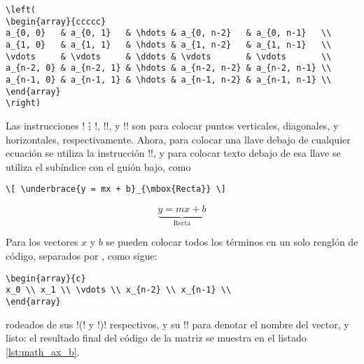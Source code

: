 \begin{lstlisting}[style=latex,numbers=none]
\left(
\begin{array}{ccccc}
a_{0, 0}   & a_{0, 1}   & \hdots & a_{0, n-2}   & a_{0, n-1}   \\
a_{1, 0}   & a_{1, 1}   & \hdots & a_{1, n-2}   & a_{1, n-1}   \\
\vdots     & \vdots     & \ddots & \vdots       & \vdots       \\
a_{n-2, 0} & a_{n-2, 1} & \hdots & a_{n-2, n-2} & a_{n-2, n-1} \\
a_{n-1, 0} & a_{n-1, 1} & \hdots & a_{n-1, n-2} & a_{n-1, n-1} \\
\end{array}
\right)
\end{lstlisting}

Las instrucciones !\vdots!, !\ddots!, y !\hdots! son para colocar puntos verticales, diagonales, y horizontales, respectivamente. Ahora, para colocar una llave debajo de cualquier ecuación se utiliza la instrucción !!, y para colocar texto debajo de esa llave se utiliza el subíndice con el guión bajo, como

\lstrulet
\noindent\begin{minipage}{0.7\linewidth}
\begin{lstlisting}[style=latex,frame={}]
\[ \underbrace{y = mx + b}_{\mbox{Recta}} \]
\end{lstlisting}
\end{minipage}
\begin{minipage}{0.3\linewidth}
\[ \underbrace{y = mx + b}_{\mbox{Recta}} \]
\end{minipage}\vspace{2mm}
\lstruleb

Para los vectores $x$ y $b$ se pueden colocar todos los términos en un solo renglón de código, separados por \codigo{\textbackslash{}}, como sigue:

\begin{lstlisting}[style=latex,numbers=none]
\begin{array}{c}
x_0 \\ x_1 \\ \vdots \\ x_{n-2} \\ x_{n-1} \\
\end{array}
\end{lstlisting}

\noindent rodeados de sus !\left(! y !\right)! respectivos, y su !\underbrace! para denotar el nombre del vector, y listo: el resultado final del código de la matriz se muestra en el listado \ref{lst:math_ax_b}.

